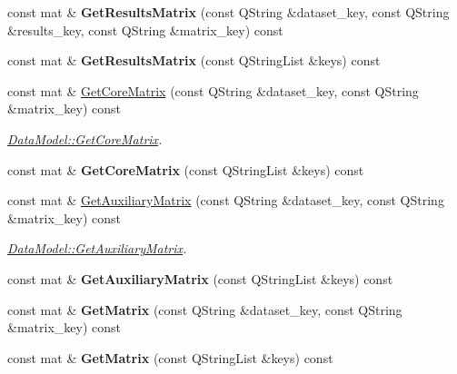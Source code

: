 \begin{DoxyCompactItemize}
\item 
const mat \& {\bfseries Get\+Results\+Matrix} (const Q\+String \&dataset\+\_\+key, const Q\+String \&results\+\_\+key, const Q\+String \&matrix\+\_\+key) const \hypertarget{class_data_model_af2b05c5c8baaaba3c527c93da653ce09}{}\label{class_data_model_af2b05c5c8baaaba3c527c93da653ce09}

\item 
const mat \& {\bfseries Get\+Results\+Matrix} (const Q\+String\+List \&keys) const \hypertarget{class_data_model_a3198834d9eae938358dae1b0a51dd97d}{}\label{class_data_model_a3198834d9eae938358dae1b0a51dd97d}

\item 
const mat \& \hyperlink{class_data_model_ad168adfafdd3c9c6a7317a77df2c62e5}{Get\+Core\+Matrix} (const Q\+String \&dataset\+\_\+key, const Q\+String \&matrix\+\_\+key) const 
\begin{DoxyCompactList}\small\item\em \hyperlink{class_data_model_ad168adfafdd3c9c6a7317a77df2c62e5}{Data\+Model\+::\+Get\+Core\+Matrix}. \end{DoxyCompactList}\item 
const mat \& {\bfseries Get\+Core\+Matrix} (const Q\+String\+List \&keys) const \hypertarget{class_data_model_a8ef59d0778dc0c9605c46312291c25bb}{}\label{class_data_model_a8ef59d0778dc0c9605c46312291c25bb}

\item 
const mat \& \hyperlink{class_data_model_a826f3ec440b4fbcecb47eb9f1e7ceb3f}{Get\+Auxiliary\+Matrix} (const Q\+String \&dataset\+\_\+key, const Q\+String \&matrix\+\_\+key) const 
\begin{DoxyCompactList}\small\item\em \hyperlink{class_data_model_a826f3ec440b4fbcecb47eb9f1e7ceb3f}{Data\+Model\+::\+Get\+Auxiliary\+Matrix}. \end{DoxyCompactList}\item 
const mat \& {\bfseries Get\+Auxiliary\+Matrix} (const Q\+String\+List \&keys) const \hypertarget{class_data_model_a2426bc75ca0cf413fcbebb63bee0a326}{}\label{class_data_model_a2426bc75ca0cf413fcbebb63bee0a326}

\item 
const mat \& {\bfseries Get\+Matrix} (const Q\+String \&dataset\+\_\+key, const Q\+String \&matrix\+\_\+key) const \hypertarget{class_data_model_a2752763eb2c2d7be9cb10b45024ad8d6}{}\label{class_data_model_a2752763eb2c2d7be9cb10b45024ad8d6}

\item 
const mat \& {\bfseries Get\+Matrix} (const Q\+String\+List \&keys) const \hypertarget{class_data_model_a249dcd7395fc083902f5a0df3d0ed11c}{}\label{class_data_model_a249dcd7395fc083902f5a0df3d0ed11c}


\end{DoxyCompactItemize}
